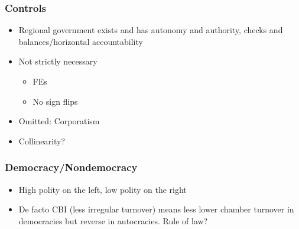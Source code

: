 \documentclass[]{beamer}
\begin{document}
    \begin{frame}
        \frametitle{Controls}
        \begin{itemize}
            \item Regional government exists and has autonomy and authority, checks and balances/horizontal accountability
            \item Not strictly necessary
        \begin{itemize}
            \item FEs
            \item No sign flips
        \end{itemize}
            \item Omitted: Corporatism
            \item Collinearity?
        \end{itemize}
    \end{frame}


    \begin{frame}
        \frametitle{Democracy/Nondemocracy}
        \begin{itemize}
            \item High polity on the left, low polity on the right
            \item De facto CBI (less irregular turnover) means less lower chamber turnover in democracies but reverse in autocracies. Rule of law?
        \end{itemize}
    \end{frame}
\end{document}
